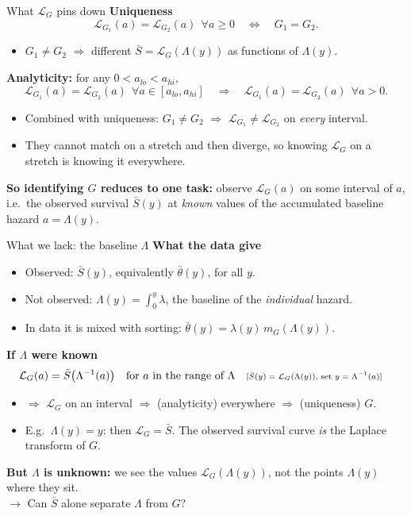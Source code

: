 \documentclass[aspectratio=169,10pt]{beamer}
\newcommand{\Lap}{\mathcal{L}}
\newcommand{\why}[1]{\text{\scriptsize[#1]}}
\begin{document}
\begin{frame}[label=m-lap2]{What $\Lap_G$ pins down}
  \textbf{Uniqueness}
  \[ \Lap_{G_1}(a)=\Lap_{G_2}(a)\ \ \forall a\ge0 \quad\Longleftrightarrow\quad G_1=G_2. \]
  \begin{itemize}
    \item $G_1\neq G_2$ $\Rightarrow$ different $\bar S=\Lap_G(\Lambda(y))$ as functions of $\Lambda(y)$.
  \end{itemize}
  \bigskip
  \textbf{Analyticity:} for any $0<a_{lo}<a_{hi}$,
  \[ \Lap_{G_1}(a)=\Lap_{G_2}(a)\ \ \forall a\in[a_{lo},a_{hi}] \quad\Longrightarrow\quad \Lap_{G_1}(a)=\Lap_{G_2}(a)\ \ \forall a>0. \]
  \begin{itemize}
    \item Combined with uniqueness: $G_1\neq G_2$ $\Rightarrow$ $\Lap_{G_1}\neq\Lap_{G_2}$ on \emph{every} interval.
    \item They cannot match on a stretch and then diverge, so knowing $\Lap_G$ on a stretch is knowing it everywhere.
  \end{itemize}
  \bigskip
  \textbf{So identifying $G$ reduces to one task:} observe $\Lap_G(a)$ on some interval of $a$, i.e.\ the observed survival $\bar S(y)$ at \emph{known} values of the accumulated baseline hazard $a=\Lambda(y)$.
  \vfill\hfill\hyperlink{p-lap2}{}
\end{frame}

\begin{frame}[label=m-lack]{What we lack: the baseline $\Lambda$}
  \textbf{What the data give}
  \begin{itemize}
    \item Observed: $\bar S(y)$, equivalently $\bar\theta(y)$, for all $y$.
    \item Not observed: $\Lambda(y)=\int_0^y\lambda$, the baseline of the \emph{individual} hazard.
    \item In data it is mixed with sorting: $\bar\theta(y)=\lambda(y)\,m_G(\Lambda(y))$.
  \end{itemize}
  \bigskip
  \textbf{If $\Lambda$ were known}
  \begin{align*}
    \Lap_G(a) &= \bar S\big(\Lambda^{-1}(a)\big)\quad\text{for $a$ in the range of }\Lambda && \why{$\bar S(y)=\Lap_G(\Lambda(y))$, set $y=\Lambda^{-1}(a)$}
  \end{align*}
  \begin{itemize}
    \item $\Rightarrow$ $\Lap_G$ on an interval $\Rightarrow$ (analyticity) everywhere $\Rightarrow$ (uniqueness) $G$.
    \item E.g.\ $\Lambda(y)=y$: then $\Lap_G=\bar S$. The observed survival curve \emph{is} the Laplace transform of $G$.
  \end{itemize}
  \bigskip
  \textbf{But $\Lambda$ is unknown:} we see the values $\Lap_G(\Lambda(y))$, not the points $\Lambda(y)$ where they sit.\\[4pt]
  $\rightarrow$ Can $\bar S$ alone separate $\Lambda$ from $G$?
\end{frame}
\end{document}
